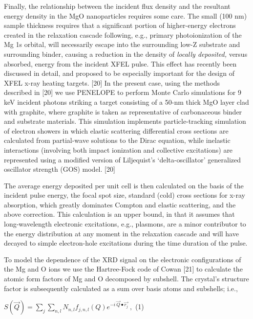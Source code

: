 Finally, the relationship between the incident flux density and the
resultant energy density in the MgO nanoparticles requires some care.
The small (100 nm) sample thickness requires that a significant portion
of higher-energy electrons created in the relaxation cascade following,
e.g., primary photoionization of the Mg 1s orbital, will necessarily
escape into the surrounding low-Z substrate and surrounding binder,
causing a reduction in the density of \emph{locally deposited,} versus
absorbed, energy from the incident XFEL pulse. This effect has recently
been discussed in detail, and proposed to be especially important for
the design of XFEL x-ray heating targets. {[}20{]} In the present case,
using the methods described in {[}20{]} we use PENELOPE to perform Monte
Carlo simulations for 9 keV incident photons striking a target
consisting of a 50-nm thick MgO layer clad with graphite, where graphite
is taken as representative of carbonaceous binder and substrate
materials. This simulation implements particle-tracking simulation of
electron showers in which elastic scattering differential cross sections
are calculated from partial-wave solutions to the Dirac equation, while
inelastic interactions (involving both impact ionization and collective
excitations) are represented using a modified version of Liljequist's
`delta-oscillator' generalized oscillator strength (GOS) model. {[}20{]}

The average energy deposited per unit cell is then calculated on the
basis of the incident pulse energy, the focal spot size, standard (cold)
cross sections for x-ray absorption, which greatly dominates Compton and
elastic scattering, and the above correction. This calculation is an
upper bound, in that it assumes that long-wavelength electronic
excitations, e.g., plasmons, are a minor contributor to the energy
distribution at any moment in the relaxation cascade and will have
decayed to simple electron-hole excitations during the time duration of
the pulse.

To model the dependence of the XRD signal on the electronic
configurations of the Mg and O ions we use the Hartree-Fock code of
Cowan {[}21{]} to calculate the atomic form factors of Mg and O
decomposed by subshell. The crystal's structure factor is subsequently
calculated as a sum over basis atoms and subshells; i.e.,

\(S\left( \overrightarrow{Q} \right) = \sum_{j}^{}{\sum_{n,l}N_{n,l}f_{j,n,l}\left( Q \right)e^{- i\ \overrightarrow{Q} \bullet \overrightarrow{r_{j}}}\ },\)
(1)

